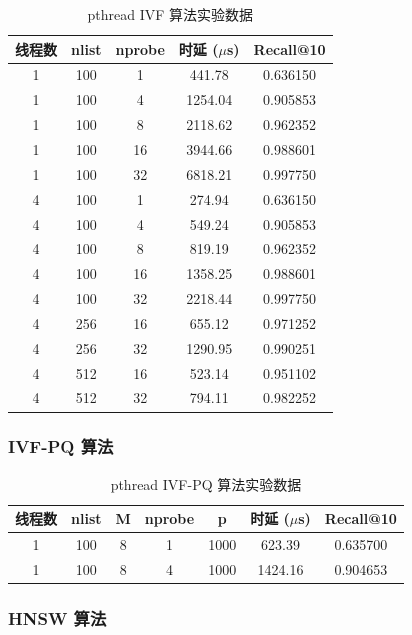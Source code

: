 \documentclass[a4paper]{article}
\begin{document}
\begin{table}[H]
\centering
\caption{pthread IVF 算法实验数据}
\begin{tabular}{ccccc}
\toprule
线程数 & nlist & nprobe & 时延 ($\mu$s) & Recall@10 \\
\midrule
1 & 100 & 1 & 441.78 & 0.636150 \\
1 & 100 & 4 & 1254.04 & 0.905853 \\
1 & 100 & 8 & 2118.62 & 0.962352 \\
1 & 100 & 16 & 3944.66 & 0.988601 \\
1 & 100 & 32 & 6818.21 & 0.997750 \\
4 & 100 & 1 & 274.94 & 0.636150 \\
4 & 100 & 4 & 549.24 & 0.905853 \\
4 & 100 & 8 & 819.19 & 0.962352 \\
4 & 100 & 16 & 1358.25 & 0.988601 \\
4 & 100 & 32 & 2218.44 & 0.997750 \\
4 & 256 & 16 & 655.12 & 0.971252 \\
4 & 256 & 32 & 1290.95 & 0.990251 \\
4 & 512 & 16 & 523.14 & 0.951102 \\
4 & 512 & 32 & 794.11 & 0.982252 \\
\bottomrule
\end{tabular}
\end{table}

\subsubsection{IVF-PQ 算法}

\begin{table}[H]
\centering
\caption{pthread IVF-PQ 算法实验数据}
\begin{tabular}{ccccccc}
\toprule
线程数 & nlist & M & nprobe & p & 时延 ($\mu$s) & Recall@10 \\
\midrule
1 & 100 & 8 & 1 & 1000 & 623.39 & 0.635700 \\
1 & 100 & 8 & 4 & 1000 & 1424.16 & 0.904653 \\
\bottomrule
\end{tabular}
\end{table}

\subsubsection{HNSW 算法}
\end{document}
